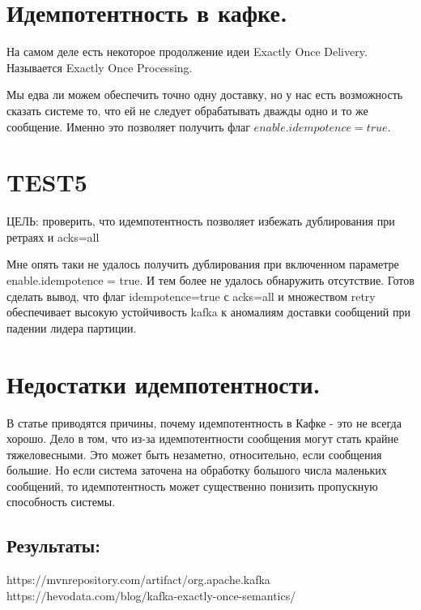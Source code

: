 \documentclass[11pt]{article}
\begin{document}
    \section{Идемпотентность в кафке.}
    На самом деле есть некоторое продолжение идеи Exactly Once Delivery. Называется Exactly Once Processing.

    Мы едва ли можем обеспечить точно одну доставку, но у нас есть возможность сказать системе то, что ей не следует обрабатывать дважды одно и то же сообщение. Именно это позволяет получить флаг $enable.idempotence = true$.
    
    \section{TEST5}
    ЦЕЛЬ: проверить, что идемпотентность позволяет избежать дублирования при ретраях и acks=all

    Мне опять таки не удалось получить дублирования при включенном параметре enable.idempotence = true. И тем более не удалось обнаружить отсутствие. Готов сделать вывод, что флаг idempotence=true с acks=all и множеством retry обеспечивает высокую устойчивость kafka к аномалиям доставки сообщений при падении лидера партиции.
    \section{Недостатки идемпотентности.}
    В статье \cite{k2} приводятся причины, почему идемпотентность в Кафке - это не всегда хорошо. Дело в том, что
    из-за идемпотентности сообщения могут стать крайне тяжеловесными. Это может быть незаметно, относительно, если
    сообщения большие. Но если система заточена на обработку большого числа маленьких сообщений, то идемпотентность
    может существенно понизить пропускную способность системы.
    \subsection{Результаты:}
    \begin{thebibliography}
         https://mvnrepository.com/artifact/org.apache.kafka
         https://hevodata.com/blog/kafka-exactly-once-semantics/
    \end{thebibliography}
\end{document}
